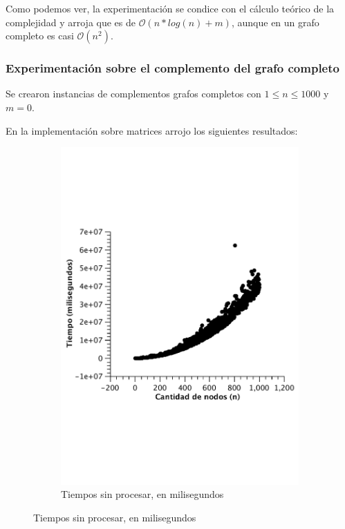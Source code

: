 Como podemos ver, la experimentación se condice con el cálculo teórico de la complejidad y arroja que es de $\mathcal{O}(n*log(n) + m)$, aunque en un grafo completo es casi $\mathcal{O}(n^2)$.



\subsubsection{Experimentación sobre el complemento del grafo completo}

Se crearon instancias de complementos grafos completos con $1 \leq n \leq 1000$ y $m = 0$.

En la implementación sobre matrices arrojo los siguientes resultados:\\ 

\begin{figure}[H]
        \centering
\begin{subfigure}[b]{0.5\textwidth}
                \includegraphics[width=\textwidth]{imagenes/vacio-matriz-1.pdf}
                \caption{Tiempos sin procesar, en milisegundos}
        \end{subfigure}%


\end{figure}
